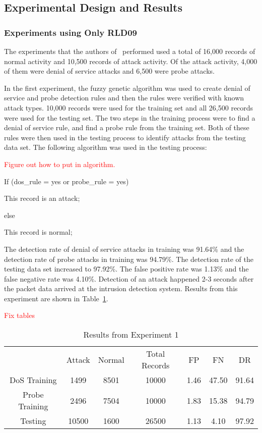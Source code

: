 \documentclass{sig-alternate}
\newcommand{\mycomment}[1]{\textcolor{red}{#1}}
\begin{document}
\subsection{Experimental Design and Results}
\subsubsection{Experiments using Only RLD09}
The experiments that the authors of~\cite{6496342, 6559603} performed used a total of 16,000 records of normal activity and 10,500 records of attack activity. Of the attack activity, 4,000 of them were denial of service attacks and 6,500 were probe attacks.

In the first experiment, the fuzzy genetic algorithm was used to create denial of service and probe detection rules and then the rules were verified with known attack types. 10,000 records were used for the training set and all 26,500 records were used for the testing set. The two steps in the training process were to find a denial of service rule, and find a probe rule from the training set. Both of these rules were then used in the testing process to identify attacks from the testing data set. The following algorithm was used in the testing process:

\mycomment{Figure out how to put in algorithm.}

If (dos\_rule = yes or probe\_rule = yes)

   This record is an attack;

else

   This record is normal;



The detection rate of denial of service attacks in training was 91.64\% and the detection rate of probe attacks in training was 94.79\%. The detection rate of the testing data set increased to 97.92\%. The false positive rate was 1.13\% and the false negative rate was 4.10\%. Detection of an attack happened 2-3 seconds after the packet data arrived at the intrusion detection system. Results from this experiment are shown in Table~\ref{tab:fuzGenExp1}.

\mycomment{Fix tables}

\begin{table}
\caption{Results from Experiment 1}
\begin{tabular}{|ccccccc|} \hline
 & Attack & Normal & Total Records & FP & FN & DR\\
DoS Training & 1499 & 8501 & 10000 & 1.46 & 47.50 & 91.64\\
Probe Training & 2496 & 7504 & 10000 & 1.83 & 15.38 & 94.79\\
Testing & 10500 & 1600 & 26500 & 1.13 & 4.10 & 97.92\\
\hline\end{tabular}
\label{tab:fuzGenExp1}
\end{table}
\end{document}
